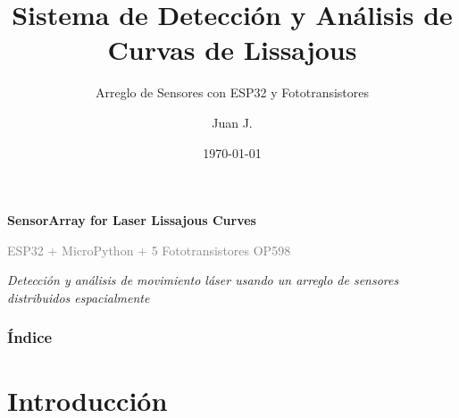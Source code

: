 \documentclass[xcolor=dvipsnames]{beamer}
\title[SensorArray Lissajous]{Sistema de Detección y Análisis de Curvas de Lissajous}
\subtitle{Arreglo de Sensores con ESP32 y Fototransistores}
\author[Juan J.]{Juan J.}
\institute[Universidad]{Proyecto de Investigación Universitaria}
\date{\today}
\begin{document}
\begin{frame}
    \begin{center}
        \vspace{0.5cm}
        \textcolor{UniBlue}{\Large \textbf{SensorArray for Laser Lissajous Curves}}
        
        \vspace{0.3cm}
        \textcolor{gray}{ESP32 + MicroPython + 5 Fototransistores OP598}
        
        \vspace{0.5cm}
        \begin{minipage}{0.8\textwidth}
            \centering
            \textit{Detección y análisis de movimiento láser usando un arreglo de sensores distribuidos espacialmente}
        \end{minipage}
    \end{center}
\end{frame}

\begin{frame}
    \frametitle{Índice}
    \tableofcontents
\end{frame}

\section{Introducción}
\end{document}
